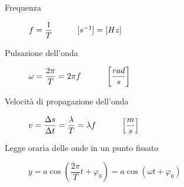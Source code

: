 \documentclass[a4paper,11pt,italian]{article}
\begin{document}
\begin{description}
%   
%   
%   
%   
%   
%   
  
  \item[Frequenza] 
$ f = \dfrac{1}{T} \hspace*{3em} [s^{-1}]=[ Hz] $
  
  \item[Pulsazione dell'onda] $ \omega = \dfrac{2\pi}{T} = 2\pi f \hspace*{3em} \left[ \dfrac{rad}{s} \right] $
  
  
  \item[Velocità di propagazione dell'onda] $ v = \dfrac{\Delta s}{\Delta t} = \dfrac{\lambda}{T} = \lambda f \hspace*{3em} \left[ \dfrac{m}{s} \right] $
  
  \item[Legge oraria delle onde in un punto fissato] $ y = a \cos\left(\dfrac{2 \pi}{T}t + \varphi_0\right) = a \cos\left(\omega t + \varphi_0\right) $
  

\end{description}
\end{document}
